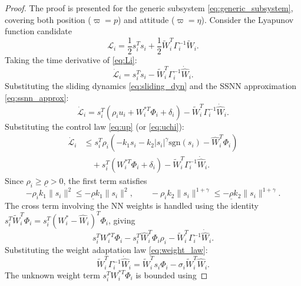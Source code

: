 \begin{proof}
The proof is presented for the generic subsystem \eqref{eq:generic_subsystem},
covering both position ($\varpi = p$) and attitude ($\varpi = \eta$). Consider
the Lyapunov function candidate
\begin{equation}
    \mathcal{L}_i = \frac{1}{2} s_i^T s_i
    + \frac{1}{2} \tilde{W}_i^T \Gamma_i^{-1} \tilde{W}_i.
    \label{eq:Li}
\end{equation}
Taking the time derivative of \eqref{eq:Li}:
\begin{equation}
    \dot{\mathcal{L}}_i = s_i^T \dot{s}_i
    - \tilde{W}_i^T \Gamma_i^{-1} \dot{\hat{W}}_i.
    \label{eq:Lidot}
\end{equation}
Substituting the sliding dynamics \eqref{eq:sliding_dyn} and the SSNN
approximation \eqref{eq:ssnn_approx}:
\begin{equation}
    \dot{\mathcal{L}}_i = s_i^T \left(\rho_i u_i + W_i^{*T}\Phi_i + \delta_i\right)
    - \tilde{W}_i^T \Gamma_i^{-1} \dot{\hat{W}}_i.
    \label{eq:Lidot2}
\end{equation}
Substituting the control law \eqref{eq:up} (or \eqref{eq:uchi}):
\begin{align}
    \dot{\mathcal{L}}_i &\leq s_i^T \rho_i \left(-k_{1} s_i
    - k_{2}|s_i|^\gamma \text{sgn}(s_i)
    - \hat{W}_i^T \Phi_i\right) \nonumber\\
    &\quad + s_i^T\left(W_i^{*T}\Phi_i + \delta_i\right)
    - \tilde{W}_i^T \Gamma_i^{-1} \dot{\hat{W}}_i.
    \label{eq:Lidot3}
\end{align}
Since $\rho_i \geq \underline{\rho} > 0$, the first term satisfies
\begin{equation}
    -\rho_i k_1 \|s_i\|^2 \leq -\underline{\rho} k_1 \|s_i\|^2, \qquad
    -\rho_i k_2 \|s_i\|^{1+\gamma} \leq -\underline{\rho} k_2 \|s_i\|^{1+\gamma}.
\end{equation}
The cross term involving the NN weights is handled using the identity
$s_i^T \tilde{W}_i^T \Phi_i = s_i^T (W_i^* - \hat{W}_i)^T \Phi_i$, giving
\begin{equation}
    s_i^T W_i^{*T}\Phi_i - s_i^T \hat{W}_i^T \Phi_i \rho_i
    - \tilde{W}_i^T \Gamma_i^{-1} \dot{\hat{W}}_i.
\end{equation}
Substituting the weight adaptation law \eqref{eq:weight_law}:
\begin{equation}
    \tilde{W}_i^T \Gamma_i^{-1} \dot{\hat{W}}_i =
    \tilde{W}_i^T s_i \Phi_i - \sigma_i \tilde{W}_i^T \hat{W}_i.
\end{equation}
The unknown weight term $s_i^T W_i^{*T} \Phi_i$ is bounded using

\end{proof}
